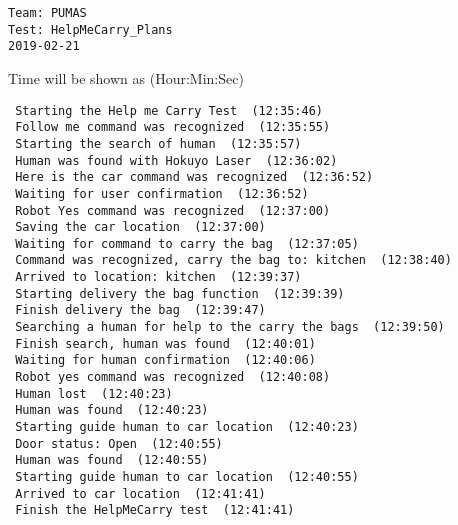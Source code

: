\documentclass{article}
\begin{document}
\begin{center}
\begingroup
\fontsize{16pt}{17pt}\selectfont
\begin{BVerbatim}
Team: PUMAS
Test: HelpMeCarry_Plans
2019-02-21
\end{BVerbatim}
\endgroup 
\end{center}
\begingroup
\fontsize{9pt}{9pt}\selectfont
\begin{quoting}[indentfirst=true]
\hspace*{\fill} Time will be shown as (Hour:Min:Sec)\\
\end{quoting}
\endgroup
\verb| Starting the Help me Carry Test  (12:35:46) |\\
\verb| Follow me command was recognized  (12:35:55) |\\
\verb| Starting the search of human  (12:35:57) |\\
\verb| Human was found with Hokuyo Laser  (12:36:02) |\\
\verb| Here is the car command was recognized  (12:36:52) |\\
\verb| Waiting for user confirmation  (12:36:52) |\\
\verb| Robot Yes command was recognized  (12:37:00) |\\
\verb| Saving the car location  (12:37:00) |\\
\verb| Waiting for command to carry the bag  (12:37:05) |\\
\verb| Command was recognized, carry the bag to: kitchen  (12:38:40) |\\
\verb| Arrived to location: kitchen  (12:39:37) |\\
\verb| Starting delivery the bag function  (12:39:39) |\\
\verb| Finish delivery the bag  (12:39:47) |\\
\verb| Searching a human for help to the carry the bags  (12:39:50) |\\
\verb| Finish search, human was found  (12:40:01) |\\
\verb| Waiting for human confirmation  (12:40:06) |\\
\verb| Robot yes command was recognized  (12:40:08) |\\
\verb| Human lost  (12:40:23) |\\
\verb| Human was found  (12:40:23) |\\
\verb| Starting guide human to car location  (12:40:23) |\\
\verb| Door status: Open  (12:40:55) |\\
\verb| Human was found  (12:40:55) |\\
\verb| Starting guide human to car location  (12:40:55) |\\
\verb| Arrived to car location  (12:41:41) |\\
\verb| Finish the HelpMeCarry test  (12:41:41) |\\
\end{document}
